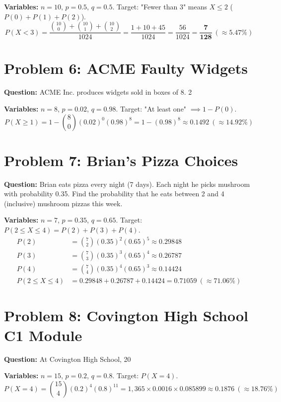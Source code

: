 \documentclass[11pt,a4paper]{article}
\begin{document}
\noindent\textbf{Variables:} $n = 10$, $p = 0.5$, $q = 0.5$. Target: "Fewer than 3" means $X \le 2$ ($P(0) + P(1) + P(2)$).
$$P(X < 3) = \frac{\binom{10}{0} + \binom{10}{1} + \binom{10}{2}}{1024} = \frac{1 + 10 + 45}{1024} = \frac{56}{1024} = \mathbf{\frac{7}{128}} \ (\approx 5.47\%)$$

\section*{Problem 6: ACME Faulty Widgets}
\textbf{Question:} ACME Inc. produces widgets sold in boxes of 8. 2%

\noindent\textbf{Variables:} $n = 8$, $p = 0.02$, $q = 0.98$. Target: "At least one" $\implies 1 - P(0)$.
$$P(X \ge 1) = 1 - \binom{8}{0}(0.02)^0(0.98)^8 = 1 - (0.98)^8 \approx \mathbf{0.1492} \ (\approx 14.92\%)$$

\section*{Problem 7: Brian's Pizza Choices}
\textbf{Question:} Brian eats pizza every night (7 days). Each night he picks mushroom with probability 0.35. Find the probability that he eats between 2 and 4 (inclusive) mushroom pizzas this week.

\noindent\textbf{Variables:} $n = 7$, $p = 0.35$, $q = 0.65$. Target: $P(2 \le X \le 4) = P(2) + P(3) + P(4)$.
\begin{align*}
    P(2) &= \binom{7}{2}(0.35)^2(0.65)^5 \approx 0.29848 \\
    P(3) &= \binom{7}{3}(0.35)^3(0.65)^4 \approx 0.26787 \\
    P(4) &= \binom{7}{4}(0.35)^4(0.65)^3 \approx 0.14424 \\
    P(2 \le X \le 4) &= 0.29848 + 0.26787 + 0.14424 = \mathbf{0.71059} \ (\approx 71.06\%)
\end{align*}

\section*{Problem 8: Covington High School C1 Module}
\textbf{Question:} At Covington High School, 20%

\noindent\textbf{Variables:} $n = 15$, $p = 0.2$, $q = 0.8$. Target: $P(X = 4)$.
$$P(X = 4) = \binom{15}{4}(0.2)^4(0.8)^{11} = 1,365 \times 0.0016 \times 0.085899 \approx \mathbf{0.1876} \ (\approx 18.76\%)$$
\end{document}
